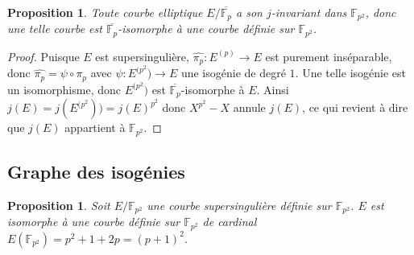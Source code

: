 \documentclass{article}
\theoremstyle{plain}%
\newtheorem{prop}[thm]{Proposition}
\theoremstyle{definition}%
\newcommand{\F}{\mathbb{F}}
\newcommand{\h}{\widehat}
\newcommand{\ol}{\overline}
\begin{document}
\begin{prop}
  Toute courbe elliptique $E/\overline{\F_p}$ a son $j$-invariant dans $\F_{p^2}$, donc une telle courbe est $\overline{\F_p}$-isomorphe à une courbe définie sur $\F_{p^2}$. 
\end{prop}

\begin{proof}
  Puisque $E$ est supersingulière, $\h{\pi_p} : E^{(p)} \to  E$ est purement inséparable, donc $\h{\pi_p} = \psi \circ \pi_p$ avec $\psi : E^{(p^2}) \to E$ une isogénie de degré $1$. Une telle isogénie est un isomorphisme, donc $ E^{(p^2}) $ est $\ol{\F_p}$-isomorphe à $E$. Ainsi $j(E) = j( E^{(p^2}) ) = j(E)^{p^2}$ donc $X^{p^2} - X$ annule $j(E)$, ce qui revient à dire que $j(E)$ appartient à $\F_{p^2}$.
\end{proof}

\subsection{Graphe des isogénies}



\begin{prop}
\label{cardsuper} 
  Soit $E/\F_{p^2}$ une courbe supersingulière définie sur $\F_{p^2}$. $E$ est isomorphe à une courbe définie sur $\F_{p^2}$ de cardinal $E(\F_{p^2}) = p^2 + 1 + 2p = (p+1)^2$.
\end{prop}
\end{document}
